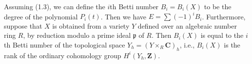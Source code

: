 Assuming (1.3), we can define the $i$th Betti number $B_i = B_i(X)$ to be the degree of the polynomial $P_i(t)$. Then we have $E = \sum (-1)^i B_i$. Furthermore, suppose that $X$ is obtained from a variety $Y$ defined over an algebraic number ring $R$, by reduction modulo a prime ideal $\mathfrak{p}$ of $R$. Then $B_i(X)$ is equal to the $i$th Betti number of the topological space $Y_h = (Y \times_R \mathbf{C})_h$, i.e., $B_i(X)$ is the rank of the ordinary cohomology group $H^i(Y_h, \mathbf{Z})$.